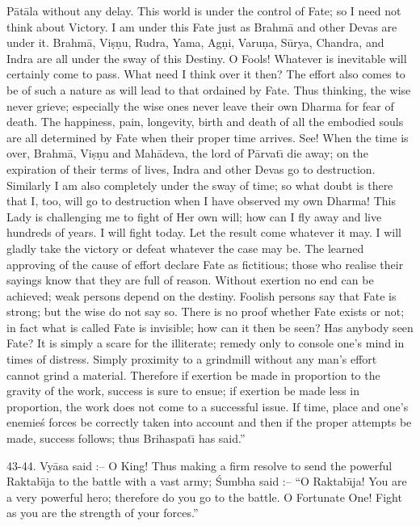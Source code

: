 P\=at\=ala without any delay. This world is under the control of Fate; so I need not think about Victory. I am under this Fate just as Brahm\=a and other Devas are under it. Brahm\=a, Vi\d{s}\d{n}u, Rudra, Yama, Ag\d{n}i, Varu\d{n}a, S\=urya, Chandra, and Indra are all under the sway of this Destiny. O Fools! Whatever is inevitable will certainly come to pass. What need I think over it then? The effort also comes to be of such a nature as will lead to that ordained by Fate. Thus thinking, the wise never grieve; especially the wise ones never leave their own Dharma for fear of death. The happiness, pain, longevity, birth and death of all the embodied souls are all determined by Fate when their proper time arrives. See! When the time is over, Brahm\=a, Vi\d{s}\d{n}u and Mah\=adeva, the lord of P\=arvat\={\i} die away; on the expiration of their terms of lives, Indra and other Devas go to destruction. Similarly I am also completely under the sway of time; so what doubt is there that I, too, will go to destruction when I have observed my own Dharma! This Lady is challenging me to fight of Her own will; how can I fly away and live hundreds of years. I will fight today. Let the result come whatever it may. I will gladly take the victory or defeat whatever the case may be. The learned approving of the cause of effort declare Fate as fictitious; those who realise their sayings know that they are full of reason. Without exertion no end can be achieved; weak persons depend on the destiny. Foolish persons say that Fate is strong; but the wise do not say so. There is no proof whether Fate exists or not; in fact what is called Fate is invisible; how can it then be seen? Has anybody seen Fate? It is simply a scare for the illiterate; remedy only to console one's mind in times of distress. Simply proximity to a grindmill without any man's effort cannot grind a material. Therefore if exertion be made in proportion to the gravity of the work, success is sure to ensue; if exertion be made less in proportion, the work does not come to a successful issue. If time, place and one's enemie\'s forces be correctly taken into account and then if the proper attempts be made, success follows; thus Brihaspat\={\i} has said.''

43-44. Vy\=asa said :-- O King! Thus making a firm resolve to send the powerful Raktab\={\i}ja to the battle with a vast army; \'Sumbha said :-- ``O Raktab\={\i}ja! You are a very powerful hero; therefore do you go to the battle. O Fortunate One! Fight as you are the strength of your forces.''

